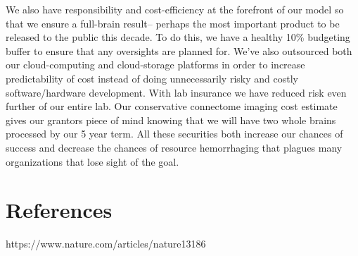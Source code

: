 \documentclass{article}
\begin{document}
We also have responsibility and cost-efficiency at the forefront of our model so that we ensure a full-brain result-- perhaps the most important product to be released to the public this decade. To do this, we have a healthy 10\% budgeting buffer to ensure that any oversights are planned for. We’ve also outsourced both our cloud-computing and cloud-storage platforms in order to increase predictability of cost instead of doing unnecessarily risky and costly software/hardware development. With lab insurance we have reduced risk even further of our entire lab. Our conservative connectome imaging cost estimate gives our grantors piece of mind knowing that we will have two whole brains processed by our 5 year term. All these securities both increase our chances of success and decrease the chances of resource hemorrhaging that plagues many organizations that lose sight of the goal.


\section{References}

https://www.nature.com/articles/nature13186






%
\end{document}
